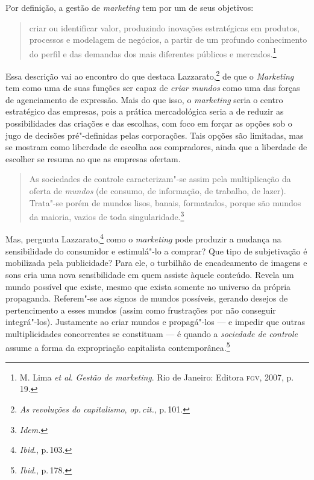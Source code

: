 Por definição, a gestão de \textit{marketing} tem por um de seus
objetivos:

\begin{quote}
criar ou identificar valor, produzindo inovações estratégicas em
produtos, processos e modelagem de negócios, a partir de um profundo
conhecimento do perfil e das demandas dos mais diferentes públicos e
mercados.\footnote{M. Lima \textit{et al}. \textit{Gestão de marketing}. Rio de Janeiro: Editora \textsc{fgv}, 2007, p.\,19.}
\end{quote}

Essa descrição vai ao encontro do que destaca Lazzarato,\footnote{\textit{As revoluções do capitalismo}, \textit{op.\,cit.}, p.\,101.}
de que o \textit{Marketing} tem como uma de suas funções ser capaz de
\textit{criar mundos} como uma das forças de agenciamento de expressão.
Mais do que isso, o \textit{marketing} seria o centro estratégico das
empresas, pois a prática mercadológica seria a de reduzir as
possibilidades das criações e das escolhas, com foco em forçar as opções
sob o jugo de decisões pré"-definidas pelas corporações. Tais opções são
limitadas, mas se mostram como liberdade de escolha aos compradores, ainda que
a liberdade de escolher se resuma ao que as empresas ofertam.

\begin{quote}
As sociedades de controle caracterizam"-se assim pela multiplicação da
oferta de \textit{mundos} (de consumo, de informação, de trabalho, de lazer).
Trata"-se porém de mundos lisos, banais, formatados, porque são mundos da
maioria, vazios de toda singularidade.\footnote{\textit{Idem.}}
\end{quote}

Mas, pergunta Lazzarato,\footnote{\textit{Ibid}., p.\,103.} como o \textit{marketing} pode
produzir a mudança na sensibilidade do consumidor e estimulá"-lo a
comprar? Que tipo de subjetivação é mobilizada pela publicidade? Para
ele, o turbilhão de encadeamento de imagens e sons cria uma nova
sensibilidade em quem assiste àquele conteúdo. Revela um mundo possível
que existe, mesmo que exista somente no universo da própria propaganda.
Referem"-se aos signos de mundos possíveis, gerando desejos de
pertencimento a esses mundos (assim como frustrações por não conseguir
integrá"-los). Justamente ao criar mundos e propagá"-los --- e impedir que
outras multiplicidades concorrentes se constituam --- é quando a
\textit{sociedade de controle} assume a forma da expropriação capitalista
contemporânea.\footnote{\textit{Ibid}., p.\,178.}

